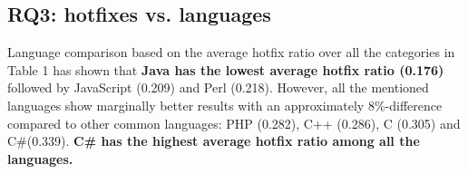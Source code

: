 \documentclass{sig-alternate}
\begin{document}



\subsection{RQ3: hotfixes vs. languages}
Language comparison based on the average hotfix ratio over all the categories in Table 1 has shown that \textbf{Java has the lowest average hotfix ratio (0.176)} followed by JavaScript (0.209) and Perl (0.218). However, all the mentioned languages show marginally better results with an approximately 8\%-difference compared to other common languages: PHP (0.282), C++ (0.286), C (0.305) and C\#(0.339). \textbf{C\# has the highest average hotfix ratio among all the languages.}
\end{document}
